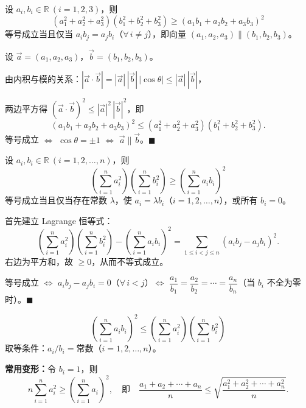 \documentclass[12pt, a4paper]{ctexart}
\begin{document}
\begin{knowledgebox}[三维形式]
设 $a_i, b_i \in \mathbb{R}\ (i=1,2,3)$，则
\[
  \boxed{(a_1^2 + a_2^2 + a_3^2)(b_1^2 + b_2^2 + b_3^2) \geqslant (a_1 b_1 + a_2 b_2 + a_3 b_3)^2}
\]
等号成立当且仅当 $a_i b_j = a_j b_i$（$\forall\, i \neq j$），即向量 $(a_1, a_2, a_3) \parallel (b_1, b_2, b_3)$。
\end{knowledgebox}

\begin{knowledgebox}
设 $\vec{a} = (a_1, a_2, a_3)$，$\vec{b} = (b_1, b_2, b_3)$。

由内积与模的关系：$|\vec{a} \cdot \vec{b}| = |\vec{a}|\,|\vec{b}|\,|\cos\theta| \leqslant |\vec{a}|\,|\vec{b}|$，

两边平方得 $(\vec{a} \cdot \vec{b})^2 \leqslant |\vec{a}|^2\,|\vec{b}|^2$，即
\[
  (a_1 b_1 + a_2 b_2 + a_3 b_3)^2 \leqslant (a_1^2 + a_2^2 + a_3^2)(b_1^2 + b_2^2 + b_3^2).
\]
等号成立 $\Leftrightarrow$ $\cos\theta = \pm 1$ $\Leftrightarrow$ $\vec{a} \parallel \vec{b}$。\hfill $\blacksquare$
\end{knowledgebox}

\begin{knowledgebox}[$n$ 维一般形式]
设 $a_i, b_i \in \mathbb{R}\ (i=1,2,\ldots,n)$，则
\[
  \boxed{\left(\sum_{i=1}^{n} a_i^2\right)\left(\sum_{i=1}^{n} b_i^2\right) \geqslant \left(\sum_{i=1}^{n} a_i b_i\right)^2}
\]
等号成立当且仅当存在常数 $\lambda$，使 $a_i = \lambda b_i$（$i=1,2,\ldots,n$），或所有 $b_i = 0$。
\end{knowledgebox}

\begin{knowledgebox}
首先建立 Lagrange 恒等式：
\[
  \left(\sum_{i=1}^{n} a_i^2\right)\left(\sum_{i=1}^{n} b_i^2\right) - \left(\sum_{i=1}^{n} a_i b_i\right)^2 = \sum_{1 \leqslant i < j \leqslant n} (a_i b_j - a_j b_i)^2.
\]
右边为平方和，故 $\geqslant 0$，从而不等式成立。

等号成立 $\Leftrightarrow$ $a_i b_j - a_j b_i = 0$（$\forall\, i < j$）$\Leftrightarrow$ $\dfrac{a_1}{b_1} = \dfrac{a_2}{b_2} = \cdots = \dfrac{a_n}{b_n}$（当 $b_i$ 不全为零时）。\hfill $\blacksquare$
\end{knowledgebox}

\begin{knowledgebox}
\[
  \boxed{\left(\sum_{i=1}^{n} a_i b_i\right)^2 \leqslant \left(\sum_{i=1}^{n} a_i^2\right)\left(\sum_{i=1}^{n} b_i^2\right)}
\]
取等条件：$a_i / b_i = \text{常数}$（$i=1,2,\ldots,n$）。

\medskip
\noindent\textbf{常用变形：}令 $b_i = 1$，则
\[
  n\sum_{i=1}^{n} a_i^2 \geqslant \left(\sum_{i=1}^{n} a_i\right)^2, \quad \text{即}\quad \frac{a_1 + a_2 + \cdots + a_n}{n} \leqslant \sqrt{\frac{a_1^2 + a_2^2 + \cdots + a_n^2}{n}}.
\]
\end{knowledgebox}
\end{document}
